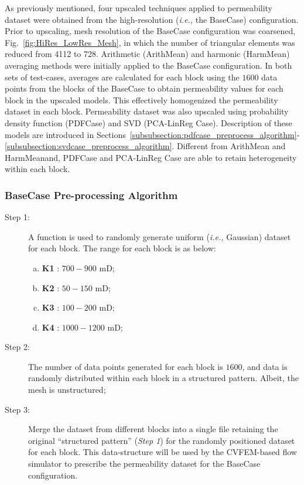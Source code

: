 \documentclass[preprint,12pt]{elsarticle}
\newcommand{\ie}{{\it i.e., }}
\begin{document}
As previously mentioned, four upscaled techniques applied to permeability dataset were obtained from the high-resolution (\ie the BaseCase) configuration. Prior to upscaling, mesh resolution of the BaseCase configuration was coarsened, Fig.~\ref{fig:HiRes_LowRes_Mesh}, in which the number of triangular elements was reduced from 4112 to 728. Arithmetic (ArithMean) and harmonic (HarmMean) averaging methods were initially applied to the BaseCase configuration. In both sets of test-cases, averages are calculated for each block using the $1600$ data points from the blocks of the BaseCase to obtain permeability values for each block in the upscaled models. This effectively homogenized the permeability dataset in each block. Permeability dataset was also upscaled using probability density function (PDFCase) and SVD (PCA-LinReg Case). Description of these models are introduced in Sections~\ref{subsubsection:pdfcase_preprocess_algorithm}-\ref{subsubsection:svdcase_preprocess_algorithm}. Different from ArithMean and HarmMeanand, PDFCase and PCA-LinReg Case are able to retain heterogeneity within each block.

\subsubsection{BaseCase Pre-processing Algorithm}\label{subsubsection:basecase_preprocess_algorithm}
\begin{description}
  \item[Step 1:] A function is used to randomly generate uniform (\ie Gaussian) dataset for each block. The range for each block is as below:
  \begin{enumerate}[a)]
    \item \textbf{K1} : $700 - 900$ mD;
    \item \textbf{K2} : $50 - 150$ mD;
    \item \textbf{K3} : $100 - 200$ mD;
    \item \textbf{K4} : $1000 - 1200$ mD;
  \end{enumerate}                                                    
  \item[Step 2:] The number of data points generated for each block is $1600$, and data is randomly distributed within each block in a structured pattern. Albeit, the mesh is unstructured;
  \item[Step 3:] Merge the dataset from different blocks into a single file retaining the original ``structured pattern'' ({\it Step 1}) for the randomly positioned dataset for each block. This data-structure will be used by the CVFEM-based flow simulator to prescribe the permeability dataset for the BaseCase configuration.
\end{description}
\end{document}
